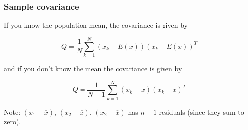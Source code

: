 \hypertarget{sample-covariance}{%
\subsubsection{Sample covariance}\label{sample-covariance}}

If you know the population mean, the covariance is given by

\[Q = \frac{1}{N} \sum_{k=1}^{N}(x_k - E(x))(x_k - E(x))^T\]

and if you don't know the mean the covariance is given by

\[Q = \frac{1}{N-1} \sum_{k=1}^{N}(x_k - \overline{x})(x_k - \overline{x})^T\]

Note: \((x_1-\overline{x})\), \((x_2-\overline{x})\),
\((x_2-\overline{x})\) has \(n-1\) residuals (since they sum to zero).
